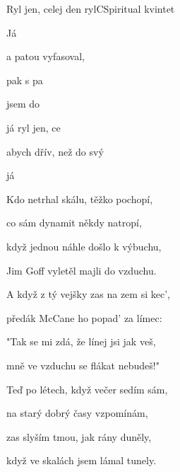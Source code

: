 \setcounter{page}{76}
\begin{song}{Ryl jen, celej den ryl}{C}{Spiritual kvintet}
\begin{SBVerse}
Já 

a patou vyfasoval,

pak s pa

jsem do
\end{SBVerse}
\begin{SBChorus}
  já ryl jen, ce

abych dřív, než do svý 

  

já 


\Ch{$|$:}{}     \Ch{:$|$}{}

\end{SBChorus}
\begin{SBVerse}
Kdo netrhal skálu, těžko pochopí,

co sám dynamit někdy natropí,

když jednou náhle došlo k výbuchu,

Jim Goff vyletěl majli do vzduchu.
\end{SBVerse}
\begin{SBVerse}
A když z tý vejšky zas na zem si kec',

předák McCane ho popad' za límec:

"Tak se mi zdá, že línej jsi jak veš,

mně ve vzduchu se flákat nebudeš!"
\end{SBVerse}
\begin{SBVerse}
Teď po létech, když večer sedím sám,

na starý dobrý časy vzpomínám,

zas slyším tmou, jak rány duněly,

když ve skalách jsem lámal tunely.
\end{SBVerse}
\end{song}

\pagebreak
